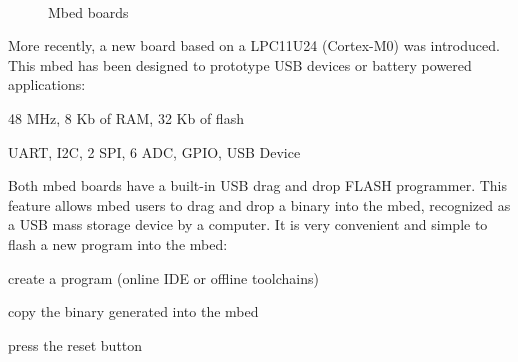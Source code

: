 \documentclass[pdftex,10pt,a4paper]{report}
\newenvironment{packed_item}{
\begin{itemize}
  \setlength{\itemsep}{1pt}
  \setlength{\parskip}{0pt}
  \setlength{\parsep}{0pt}
}{\end{itemize}}
\begin{document}
\begin{figure}[htp]
  \centering
   \\
  \caption{Mbed boards}
  \label{fig:contour}
\end{figure}

More recently, a new board based on a LPC11U24 (Cortex-M0) was introduced. This mbed has been designed to prototype USB devices or battery powered applications:
\begin{packed_item}
	\item 48 MHz, 8 Kb of RAM, 32 Kb of flash
	\item UART, I2C, 2 SPI, 6 ADC, GPIO, USB Device
\end{packed_item}


Both mbed boards have a built-in USB drag and drop FLASH programmer. This feature allows mbed users to drag and drop a binary into the mbed, recognized as a USB mass storage device by a computer. It is very convenient and simple to flash a new program into the mbed:
\begin{packed_item}
	\item create a program (online IDE or offline toolchains)
	\item copy the binary generated into the mbed 
	\item press the reset button
\end{packed_item}
\end{document}
